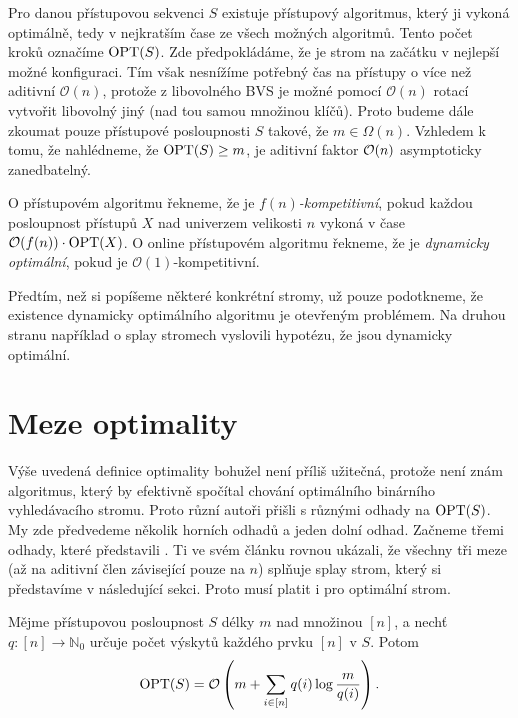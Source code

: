 Pro danou přístupovou sekvenci $S$ existuje přístupový algoritmus, který ji
vykoná optimálně, tedy v nejkratším čase ze všech možných algoritmů. Tento
počet kroků označíme $\operatorname{OPT}(S)$. Zde předpokládáme, že je strom na začátku v
nejlepší možné konfiguraci. Tím však nesnížíme potřebný čas na přístupy o více
než aditivní $\mathcal O(n)$, protože z libovolného BVS je možné pomocí
$\mathcal O(n)$ rotací vytvořit libovolný jiný (nad tou samou množinou klíčů).
Proto budeme dále zkoumat pouze přístupové posloupnosti $S$ takové, že $m \in
\Omega(n)$. Vzhledem k tomu, že nahlédneme, že $\operatorname{OPT}(S)\geq m$, je aditivní
faktor $\mathcal O(n)$ asymptoticky zanedbatelný. 


\begin{definice}
O přístupovém algoritmu řekneme, že je \emph{$f(n)$-kompetitivní}, pokud každou
posloupnost přístupů $X$ nad univerzem velikosti $n$ vykoná v čase $
\mathcal O(f(n))\cdot\operatorname{OPT}(X)$. O online přístupovém algoritmu řekneme, že je
\emph{dynamicky optimální}, pokud je $\mathcal O(1)$-kompetitivní.
\end{definice}

Předtím, než si popíšeme některé konkrétní stromy, už pouze podotkneme, že
existence dynamicky optimálního algoritmu je otevřeným problémem. Na druhou
stranu například o splay stromech vyslovili \citet{splay} hypotézu, že jsou
dynamicky optimální.

\section{Meze optimality}

Výše uvedená definice optimality bohužel není příliš užitečná, protože není znám algoritmus, který by efektivně spočítal chování optimálního binárního vyhledávacího stromu. Proto různí autoři přišli s různými odhady na $\operatorname{OPT}(S)$. My zde předvedeme několik horních odhadů a jeden dolní odhad. Začneme třemi odhady, které představili \citet{splay}. Ti ve svém článku rovnou ukázali, že všechny tři meze (až na aditivní člen závisející pouze na $n$) splňuje splay strom, který si představíme v následující sekci. Proto musí platit i pro optimální strom.

\begin{veta}
Mějme přístupovou posloupnost $S$ délky $m$ nad množinou $[n]$, a nechť $q:[n]\rightarrow \mathbb N_0$ určuje počet výskytů každého prvku $[n]$ v $S$. Potom $$\operatorname{OPT}(S) = \mathcal O\left(m + \sum_{i\in [n]}q(i)\log\frac m{q(i)}\right).$$
\end{veta}

